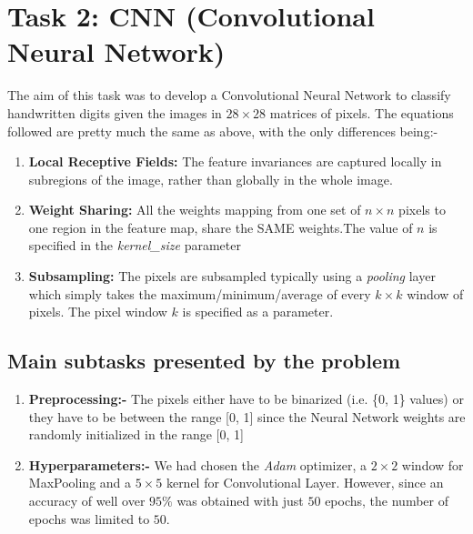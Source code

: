 \documentclass{article}
\begin{document}
\section{Task 2: CNN (Convolutional Neural Network)}
The aim of this task was to develop a Convolutional Neural Network
to classify handwritten digits given the images in $28\times28$ matrices of pixels.
The equations followed are pretty much the same as above, with the only differences being:-
    \begin{enumerate}[label=\roman*)]
        \item \textbf{Local Receptive Fields:} The feature invariances are captured locally in subregions of the image, rather than globally in the whole image.
        \item \textbf{Weight Sharing:} All the weights mapping from one set of ${n}\times{n}$ pixels to one region in the feature map, share the SAME weights.The value of $n$ is specified in the \emph{kernel\_size} parameter 
        \item \textbf{Subsampling:} The pixels are subsampled typically using a \emph{pooling} layer which simply takes the maximum/minimum/average of every ${k}\times{k}$ window of pixels. The pixel window $k$ is specified as a parameter.
    \end{enumerate}

\subsection{Main subtasks presented by the problem}
\begin{enumerate}
	\item \textbf{Preprocessing:-} The pixels either have to be binarized (i.e. \{0, 1\} values) or they have to
	      be between the range [0, 1] since the Neural Network weights are randomly initialized in the range [0, 1]
	\item \textbf{Hyperparameters:-} We had chosen the \textit{Adam} optimizer, a $2\times2$ window for MaxPooling and a $5\times5$ kernel for Convolutional Layer.
	      However, since an accuracy of well over $95\%$ was obtained with just $50$ epochs, the number of epochs was limited to $50$.
\end{enumerate}
\end{document}
